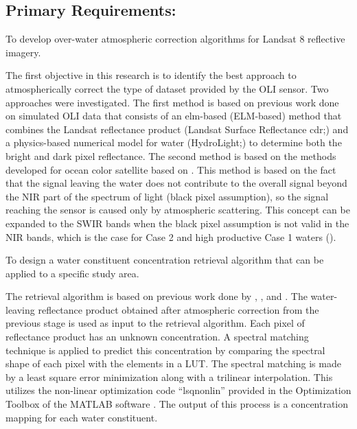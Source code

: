 \subsection{Primary Requirements:}
\begin{enumerate} 
	{\bf \item To develop over-water atmospheric correction algorithms for Landsat 8 reflective imagery.} 

The first objective in this research is to identify the best approach to atmospherically correct the type of dataset provided by the OLI sensor. Two approaches were investigated. The first method is based on previous work done on simulated OLI data \cite{Gerace:2013,Gerace:2012,GeraceThesis,Pahlevan:2012} that consists of an \acrfull{elm}-based (ELM-based) method that combines the Landsat reflectance product (Landsat Surface Reflectance \acrshort{cdr};\cite{LandsatCDR}) and a physics-based numerical model for water (HydroLight;\cite{MobleyHEtech}) to determine both the bright and dark pixel reflectance. The second method is based on the methods developed for ocean color satellite based on \cite{Gordon:1994}. This method is based on the fact that the signal leaving the water does not contribute to the overall signal beyond the NIR part of the spectrum of light (black pixel assumption), so the signal reaching the sensor is caused only by atmospheric scattering. This concept can be expanded to the SWIR bands when the black pixel assumption is not valid in the NIR bands, which is the case for Case 2 and high productive Case 1 waters (\cite{Wang:2007}).

	{\bf \item To design a water constituent concentration retrieval algorithm that can be applied to a specific study area.}

The retrieval algorithm is based on previous work done by \cite{Raqueno:2003}, \cite{GeraceThesis}, and \cite{Pahlevan:2012}. The water-leaving reflectance product obtained after atmospheric correction from the previous stage is used as input to the retrieval algorithm. Each pixel of reflectance product has an unknown concentration. A spectral matching technique is applied to predict this concentration by comparing the spectral shape of each pixel with the elements in a LUT. The spectral matching is made by a least square error minimization along with a trilinear interpolation. This utilizes the non-linear optimization code ``lsqnonlin'' provided in the Optimization Toolbox of the MATLAB software \cite{MatlabHelp}. The output of this process is a concentration mapping for each water constituent.


\end{enumerate}
